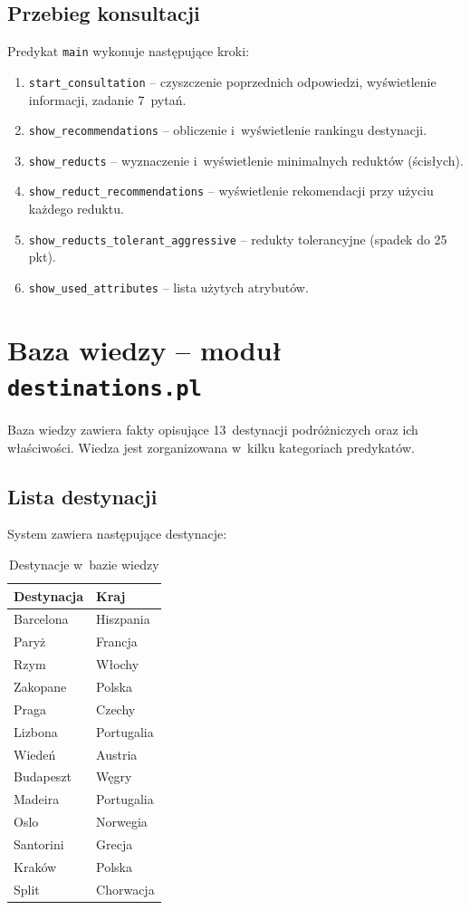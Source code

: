\documentclass[12pt,a4paper]{article}
\begin{document}
\subsection{Przebieg konsultacji}

Predykat \texttt{main} wykonuje następujące kroki:

\begin{enumerate}
    \item \texttt{start\_consultation} -- czyszczenie poprzednich odpowiedzi, wyświetlenie informacji, zadanie 7~pytań.
    \item \texttt{show\_recommendations} -- obliczenie i~wyświetlenie rankingu destynacji.
    \item \texttt{show\_reducts} -- wyznaczenie i~wyświetlenie minimalnych reduktów (ścisłych).
    \item \texttt{show\_reduct\_recommendations} -- wyświetlenie rekomendacji przy użyciu każdego reduktu.
    \item \texttt{show\_reducts\_tolerant\_aggressive} -- redukty tolerancyjne (spadek do 25 pkt).
    \item \texttt{show\_used\_attributes} -- lista użytych atrybutów.
\end{enumerate}

\section{Baza wiedzy -- moduł \texttt{destinations.pl}}

Baza wiedzy zawiera fakty opisujące 13~destynacji podróżniczych oraz ich właściwości. Wiedza jest zorganizowana w~kilku kategoriach predykatów.

\subsection{Lista destynacji}

System zawiera następujące destynacje:

\begin{table}[H]
\centering
\begin{tabular}{ll}
\toprule
\textbf{Destynacja} & \textbf{Kraj} \\
\midrule
Barcelona & Hiszpania \\
Paryż & Francja \\
Rzym & Włochy \\
Zakopane & Polska \\
Praga & Czechy \\
Lizbona & Portugalia \\
Wiedeń & Austria \\
Budapeszt & Węgry \\
Madeira & Portugalia \\
Oslo & Norwegia \\
Santorini & Grecja \\
Kraków & Polska \\
Split & Chorwacja \\
\bottomrule
\end{tabular}
\caption{Destynacje w~bazie wiedzy}
\end{table}
\end{document}

